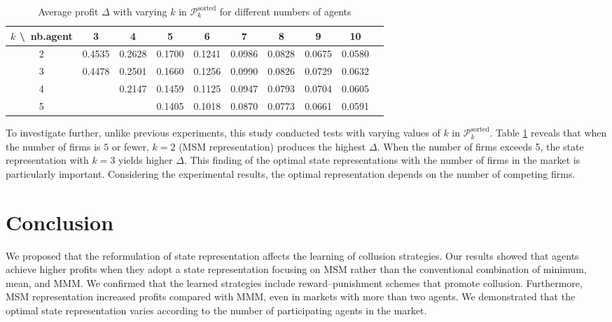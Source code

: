 \documentclass[runningheads]{llncs}
\begin{document}
    \begin{table}[tb]
        \centering
        \caption{Average profit $\Delta$ with varying $k$ in \( \mathcal{P}^{\text{sorted}}_k \) for different numbers of agents}
        \label{tab:experiment_variable_k}
        \begin{tabular}{|c|c|c|c|c|c|c|c|c|c|}
            \hline
            $k$ \textbackslash\ nb.agent & 3 & 4 & 5 & 6 & 7 & 8 & 9 & 10 \\
            \hline
            2 & 0.4535 & 0.2628 & 0.1700 & 0.1241 & 0.0986 & 0.0828 & 0.0675 & 0.0580 \\
            3 & 0.4478 & 0.2501 & 0.1660 & 0.1256 & 0.0990 & 0.0826 & 0.0729 & 0.0632 \\
            4 &  & 0.2147 & 0.1459 & 0.1125 & 0.0947 & 0.0793 & 0.0704 & 0.0605 \\
            5 &  &  & 0.1405 & 0.1018 & 0.0870 & 0.0773 & 0.0661 & 0.0591 \\
            \hline
        \end{tabular}
    \end{table}
    
   To investigate further, unlike previous experiments, this study conducted tests with varying values of $k$ in \( \mathcal{P}^{\text{sorted}}_k \). 
    Table \ref{tab:experiment_variable_k} reveals that when the number of firms is $5$ or fewer, $k=2$ (MSM representation) produces the highest $\Delta$.
    When the number of firms exceeds 5, the state representation with $k=3$ yields higher $\Delta$.
    This finding of the optimal state representations with the number of firms in the market is particularly important.
   Considering the experimental results, the optimal representation depends on the number of competing firms.

\section{Conclusion}
We proposed that the reformulation of state representation affects the learning of collusion strategies.
Our results showed that agents achieve higher profits when they adopt a state representation focusing on MSM rather than the conventional combination of minimum, mean, and MMM.
We confirmed that the learned strategies include reward--punishment schemes that promote collusion.
Furthermore, MSM representation increased profits compared with MMM, even in markets with more than two agents.
We demonstrated that the optimal state representation varies according to the number of participating agents in the market.
\end{document}

